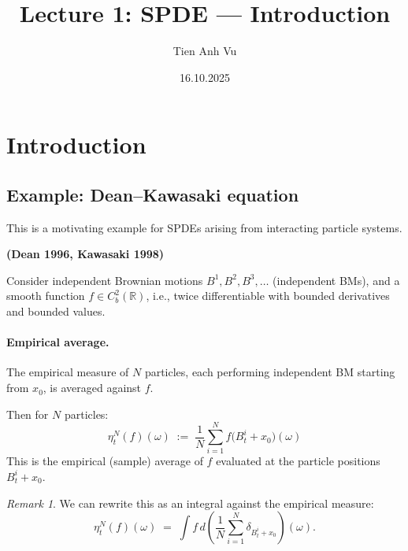 \documentclass[11pt]{article}
\title{Lecture 1: SPDE --- Introduction}
\author{}
\date{16.10.2025}
\author{Tien Anh Vu}
\theoremstyle{definition}
\theoremstyle{remark}
\newtheorem{remark}{Remark}
\begin{document}
\maketitle

\section*{Introduction}

\subsection*{Example: Dean--Kawasaki equation}

This is a motivating example for SPDEs arising from interacting particle systems.

\noindent
\textbf{(Dean 1996, Kawasaki 1998)}

Consider independent Brownian motions $B^1, B^2, B^3, \ldots$
(independent BMs), and a smooth function $f \in C_b^2(\mathbb{R})$, i.e., twice differentiable with bounded derivatives and bounded values.



\paragraph{Empirical average.}
The empirical measure of $N$ particles, each performing independent BM starting from $x_0$, is averaged against $f$.

Then for $N$ particles:
\[
    \eta_t^N(f)(\omega)
    \;:=\;
    \frac{1}{N}\sum_{i=1}^{N}
    f\!\bigl(B_t^i + x_0\bigr)(\omega)
\]
This is the empirical (sample) average of $f$ evaluated at the particle positions $B_t^i + x_0$.

\begin{remark}
We can rewrite this as an integral against the empirical measure:
\[
    \eta_t^N(f)(\omega)
    \;=\;
    \int f\,d\!\left(
        \frac{1}{N}\sum_{i=1}^{N}
        \delta_{B_t^i + x_0}
    \right)(\omega).
\]
\end{remark}
\end{document}
